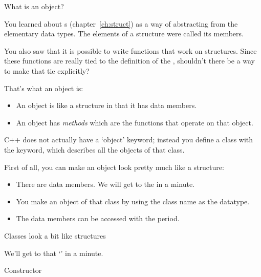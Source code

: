
 {What is an object?}
\label{sec:object}

You learned about s (chapter~\ref{ch:struct}) as a way of
abstracting from the elementary data types. The elements of a
structure were called its members.

You also saw that it is possible to write
functions that work on structures. Since these functions are really
tied to the definition of the , shouldn't there be a way to
make that tie explicitly?

That's what an object is:
\begin{itemize}
\item An object is like a structure in that it has data members.
\item An object has \emph{methods} which
  are the functions that operate on that object.
\end{itemize}
C++ does not actually have a `object' keyword; instead you define a
class with the  keyword, which describes all the objects
of that class.

First of all, you can make an object look pretty much like a
structure:
%

\begin{itemize}
\item There are data members. We will get to the  in a
  minute.
\item You make an object of that class by using the class name as the
  datatype.
\item The data members can be accessed with the period.
\end{itemize}

\begin{slide}{Classes look a bit like structures}
  \label{sl:class-struct}

  We'll get to that `' in a minute.
\end{slide}

 {Constructor}

